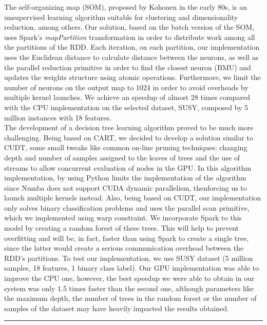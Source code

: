 The self-organizing map (SOM), proposed by Kohonen in the early 80s, is an unsupervised learning algorithm suitable for clustering and dimensionality reduction, among others. Our solution, based on the batch version of the SOM, uses Spark's \textit{mapPartition} transformation in order to distribute work among all the partitions of the RDD. Each iteration, on each partition, our implementation uses the Euclidean distance to calculate distance between the neurons, as well as the parallel reduction primitive in order to find the closest neuron (BMU) and updates the weights structure using atomic operations. Furthermore, we limit the number of neurons on the output map to 1024 in order to avoid overheads by multiple kernel launches. We achieve an speedup of almost 28 times compared with the CPU implementation on the selected dataset, SUSY, composed by 5 million instances with 18 features.\\

The development of a decision tree learning algorithm proved to be much more challenging. Being based on CART, we decided to develop a solution similar to CUDT, some small tweaks like common on-line pruning techniques: changing depth and number of samples assigned to the leaves of trees and the use of streams to allow concurrent evaluation of nodes in the GPU. In this algorithm implementation, by using Python limits the implementation of the algorithm since Numba does not support CUDA dynamic
parallelism, thenforcing us to launch multiple kernels instead. Also, being based on CUDT, our implementation only solves binary classification problems and uses the parallel scan primitive, which we implemented using warp constraint. We incorporate Spark to this model by creating a random forest of these trees. This will help to prevent overfitting and will be, in fact, faster than using Spark to create a single tree,	 since the latter would create a serious communication overhead between the RDD's partitions. To test our implementation, we use SUSY dataset (5 million samples, 18 features, 1 binary class label). Our GPU implementation was able to improve the CPU one, however, the best speedup we were able to obtain in our system was only 1.5 times faster than the second one, although parameters like the maximum depth, the number of trees in the random forest or the number of samples of the dataset may have heavily impacted the results obtained.

\newpage
\thispagestyle{empty}

\noindent\rule[-1ex]{\textwidth}{2pt}\\[4.5ex]

